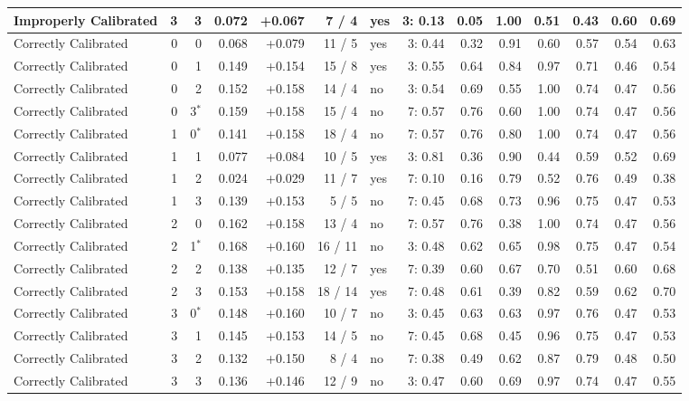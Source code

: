 \begin{tabular}{lrrrrrlrrrrrrr}
Improperly Calibrated & 3 & 3 & 0.072 & +0.067 & 7 / 4 & yes & 3: 0.13 & 0.05 & 1.00 & 0.51 & 0.43 & 0.60 & 0.69 \\
\midrule
Correctly Calibrated & 0 & 0 & 0.068 & +0.079 & 11 / 5 & yes & 3: 0.44 & 0.32 & 0.91 & 0.60 & 0.57 & 0.54 & 0.63 \\
Correctly Calibrated & 0 & 1 & 0.149 & +0.154 & 15 / 8 & yes & 3: 0.55 & 0.64 & 0.84 & 0.97 & 0.71 & 0.46 & 0.54 \\
Correctly Calibrated & 0 & 2 & 0.152 & +0.158 & 14 / 4 & no & 3: 0.54 & 0.69 & 0.55 & 1.00 & 0.74 & 0.47 & 0.56 \\
Correctly Calibrated & 0 & 3$^*$ & 0.159 & +0.158 & 15 / 4 & no & 7: 0.57 & 0.76 & 0.60 & 1.00 & 0.74 & 0.47 & 0.56 \\
Correctly Calibrated & 1 & 0$^*$ & 0.141 & +0.158 & 18 / 4 & no & 7: 0.57 & 0.76 & 0.80 & 1.00 & 0.74 & 0.47 & 0.56 \\
Correctly Calibrated & 1 & 1 & 0.077 & +0.084 & 10 / 5 & yes & 3: 0.81 & 0.36 & 0.90 & 0.44 & 0.59 & 0.52 & 0.69 \\
Correctly Calibrated & 1 & 2 & 0.024 & +0.029 & 11 / 7 & yes & 7: 0.10 & 0.16 & 0.79 & 0.52 & 0.76 & 0.49 & 0.38 \\
Correctly Calibrated & 1 & 3 & 0.139 & +0.153 & 5 / 5 & no & 7: 0.45 & 0.68 & 0.73 & 0.96 & 0.75 & 0.47 & 0.53 \\
Correctly Calibrated & 2 & 0 & 0.162 & +0.158 & 13 / 4 & no & 7: 0.57 & 0.76 & 0.38 & 1.00 & 0.74 & 0.47 & 0.56 \\
Correctly Calibrated & 2 & 1$^*$ & 0.168 & +0.160 & 16 / 11 & no & 3: 0.48 & 0.62 & 0.65 & 0.98 & 0.75 & 0.47 & 0.54 \\
Correctly Calibrated & 2 & 2 & 0.138 & +0.135 & 12 / 7 & yes & 7: 0.39 & 0.60 & 0.67 & 0.70 & 0.51 & 0.60 & 0.68 \\
Correctly Calibrated & 2 & 3 & 0.153 & +0.158 & 18 / 14 & yes & 7: 0.48 & 0.61 & 0.39 & 0.82 & 0.59 & 0.62 & 0.70 \\
Correctly Calibrated & 3 & 0$^*$ & 0.148 & +0.160 & 10 / 7 & no & 3: 0.45 & 0.63 & 0.63 & 0.97 & 0.76 & 0.47 & 0.53 \\
Correctly Calibrated & 3 & 1 & 0.145 & +0.153 & 14 / 5 & no & 7: 0.45 & 0.68 & 0.45 & 0.96 & 0.75 & 0.47 & 0.53 \\
Correctly Calibrated & 3 & 2 & 0.132 & +0.150 & 8 / 4 & no & 7: 0.38 & 0.49 & 0.62 & 0.87 & 0.79 & 0.48 & 0.50 \\
Correctly Calibrated & 3 & 3 & 0.136 & +0.146 & 12 / 9 & no & 3: 0.47 & 0.60 & 0.69 & 0.97 & 0.74 & 0.47 & 0.55 \\
\bottomrule
\end{tabular}
